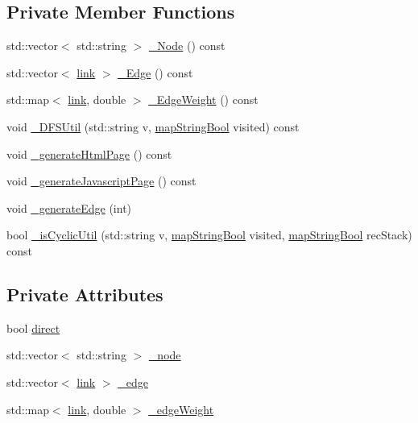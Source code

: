\subsection*{Private Member Functions}
\begin{DoxyCompactItemize}
\item 
std\-::vector$<$ std\-::string $>$ \hyperlink{classGraphLib_1_1Graph_a05961e5753c699ea21daeccbda11f734}{\-\_\-\-Node} () const 
\item 
std\-::vector$<$ \hyperlink{classGraphLib_1_1Graph_aa27f00087e5578d92522f09a991dbad5}{link} $>$ \hyperlink{classGraphLib_1_1Graph_a0660792b0f9d2b8e7984f58f6608118e}{\-\_\-\-Edge} () const 
\item 
std\-::map$<$ \hyperlink{classGraphLib_1_1Graph_aa27f00087e5578d92522f09a991dbad5}{link}, double $>$ \hyperlink{classGraphLib_1_1Graph_af11c2f08c36fe53a82bc50cc6551725f}{\-\_\-\-Edge\-Weight} () const 
\item 
void \hyperlink{classGraphLib_1_1Graph_aafb7748c78f21134b552fa72eadcb5d7}{\-\_\-\-D\-F\-S\-Util} (std\-::string v, \hyperlink{classGraphLib_1_1Graph_a727ccf2fdc487a56e523a562f592b422}{map\-String\-Bool} visited) const 
\item 
void \hyperlink{classGraphLib_1_1Graph_a5778bc515e6757169f1017dd69ed81a8}{\-\_\-generate\-Html\-Page} () const 
\item 
void \hyperlink{classGraphLib_1_1Graph_ae34e0d3e0b3b7ab05ea412e2332bcda2}{\-\_\-generate\-Javascript\-Page} () const 
\item 
void \hyperlink{classGraphLib_1_1Graph_a7c0aa9e4c26612953a27914ca9dd94e4}{\-\_\-generate\-Edge} (int)
\item 
bool \hyperlink{classGraphLib_1_1Graph_a110dbdff7dca94a4080c8e41dc33ca80}{\-\_\-is\-Cyclic\-Util} (std\-::string v, \hyperlink{classGraphLib_1_1Graph_a727ccf2fdc487a56e523a562f592b422}{map\-String\-Bool} visited, \hyperlink{classGraphLib_1_1Graph_a727ccf2fdc487a56e523a562f592b422}{map\-String\-Bool} rec\-Stack) const 
\end{DoxyCompactItemize}
\subsection*{Private Attributes}
\begin{DoxyCompactItemize}
\item 
bool \hyperlink{classGraphLib_1_1Graph_a9425d5b9f754f74abd6030e2ece5d09d}{direct}
\item 
std\-::vector$<$ std\-::string $>$ \hyperlink{classGraphLib_1_1Graph_a2d57aa86954b2fc260c8699dd9fdcd66}{\-\_\-node}
\item 
std\-::vector$<$ \hyperlink{classGraphLib_1_1Graph_aa27f00087e5578d92522f09a991dbad5}{link} $>$ \hyperlink{classGraphLib_1_1Graph_a784b9952b6bd927abf0068c10b21fb4f}{\-\_\-edge}
\item 
std\-::map$<$ \hyperlink{classGraphLib_1_1Graph_aa27f00087e5578d92522f09a991dbad5}{link}, double $>$ \hyperlink{classGraphLib_1_1Graph_a1fafe6bfd34afe63874f942408a5b858}{\-\_\-edge\-Weight}
\end{DoxyCompactItemize}


